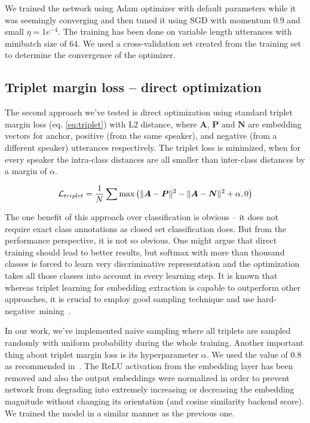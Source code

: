 \pagebreak
\noindent
We trained the network using Adam optimizer with default parameters while it was seemingly converging and then tuned it using SGD with momentum $ 0.9 $ and small $ \eta = 1e^{-4} $. The training has been done on variable length utterances with minibatch size of 64. We used a cross-validation set created from the training set to determine the convergence of the optimizer.

\subsection*{Triplet margin loss -- direct optimization}

The second approach we've tested is direct optimization using standard triplet margin loss (eq. \ref{eq:triplet}) with L2 distance, where $ \boldsymbol{A} $, $ \boldsymbol{P} $ and $ \boldsymbol{N} $ are embedding vectors for anchor, positive (from the same speaker), and negative (from a different speaker) utterances respectively. The triplet loss is minimized, when for every speaker the intra-class distances are all smaller than inter-class distances by a margin of $ \alpha $.

\begin{equation} \label{eq:triplet}
\mathcal{L}_{triplet} = \frac{1}{N} \sum \textnormal{max}
\left(
\lVert\boldsymbol{A} - \boldsymbol{P}\rVert^2 -
\lVert\boldsymbol{A} - \boldsymbol{N}\rVert^2
+ \alpha, 0 \right)
\end{equation}

\noindent
The one benefit of this approach over classification is obvious -- it does not require exact class annotations as closed set classification does. But from the performance perspective, it is not so obvious. One might argue that direct training should lead to better results, but softmax with more than thousand classes is forced to learn very discriminative representation and the optimization takes all those classes into account in every learning step. It is known that whereas triplet learning for embedding extraction is capable to outperform other approaches, it is crucial to employ good sampling technique and use hard-negative~mining~\cite{YuanYZ16}.

\medskip
In our work, we've implemented naive sampling where all triplets are sampled randomly with uniform probability during the whole training. Another important thing about triplet margin loss is its hyperparameter $ \alpha $. We used the value of 0.8 as recommended in~\cite{x_vectors_triplet}. The ReLU activation from the embedding layer has been removed and also the output embeddings were normalized in order to prevent network from degrading into extremely increasing or decreasing the embedding magnitude without changing its orientation (and cosine similarity backend score). We trained the model in a similar manner as the previous one.

